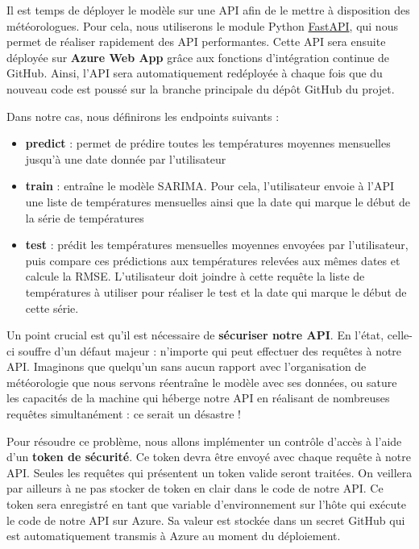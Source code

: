\documentclass[french]{article}
\begin{document}
    Il est temps de déployer le modèle sur une API afin de le mettre à disposition des météorologues. Pour cela, nous utiliserons le module Python \href{https://fastapi.tiangolo.com/}{FastAPI}, qui nous permet de réaliser rapidement des API performantes. Cette API sera ensuite déployée sur \textbf{Azure Web App} grâce aux fonctions d'intégration continue de GitHub. Ainsi, l'API sera automatiquement redéployée à chaque fois que du nouveau code est poussé sur la branche principale du dépôt GitHub du projet.

    Dans notre cas, nous définirons les endpoints suivants :
    \begin{itemize}
        \item \textbf{predict} : permet de prédire toutes les températures moyennes mensuelles jusqu'à une date donnée par l'utilisateur
        \item \textbf{train} : entraîne le modèle SARIMA. Pour cela, l'utilisateur envoie à l'API une liste de températures mensuelles ainsi que la date qui marque le début de la série de températures
        \item \textbf{test} : prédit les températures mensuelles moyennes envoyées par l'utilisateur, puis compare ces prédictions aux températures relevées aux mêmes dates et calcule la RMSE. L'utilisateur doit joindre à cette requête la liste de températures à utiliser pour réaliser le test et la date qui marque le début de cette série.
    \end{itemize}

    Un point crucial est qu'il est nécessaire de \textbf{sécuriser notre API}. En l'état, celle-ci souffre d'un défaut majeur : n'importe qui peut effectuer des requêtes à notre API. Imaginons que quelqu'un sans aucun rapport avec l'organisation de météorologie que nous servons réentraîne le modèle avec ses données, ou sature les capacités de la machine qui héberge notre API en réalisant de nombreuses requêtes simultanément : ce serait un désastre !

    Pour résoudre ce problème, nous allons implémenter un contrôle d'accès à l'aide d'un \textbf{token de sécurité}. Ce token devra être envoyé avec chaque requête à notre API. Seules les requêtes qui présentent un token valide seront traitées. On veillera par ailleurs à ne pas stocker de token en clair dans le code de notre API. Ce token sera enregistré en tant que variable d'environnement sur l'hôte qui exécute le code de notre API sur Azure. Sa valeur est stockée dans un secret GitHub qui est automatiquement transmis à Azure au moment du déploiement.
\end{document}
